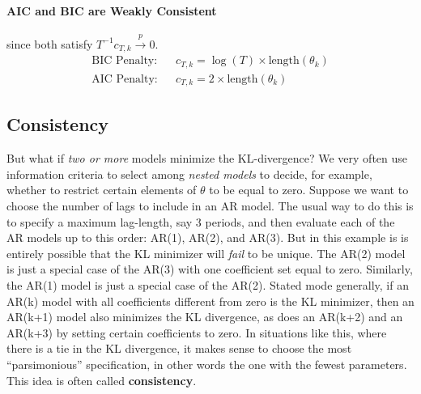 \paragraph{AIC and BIC are Weakly Consistent}
since both satisfy $T^{-1}c_{T,k} \overset{p}{\rightarrow} 0$.
	\begin{eqnarray*}
		\mbox{BIC Penalty:}&& c_{T,k} = \log(T) \times \mbox{length}(\theta_k)\\
		\mbox{AIC Penalty:} && c_{T,k} = 2\times \mbox{length}(\theta_k)
	\end{eqnarray*}

\subsection{Consistency}
But what if \emph{two or more} models minimize the KL-divergence? We very often use information criteria to select among \emph{nested models} to decide, for example, whether to restrict certain elements of $\theta$ to be equal to zero. 
Suppose we want to choose the number of lags to include in an AR model. 
The usual way to do this is to specify a maximum lag-length, say 3 periods, and then evaluate each of the AR models up to this order: AR(1), AR(2), and AR(3). 
But in this example is is entirely possible that the KL minimizer will \emph{fail} to be unique. 
The AR(2) model is just a special case of the AR(3) with one coefficient set equal to zero. 
Similarly, the AR(1) model is just a special case of the AR(2). 
Stated mode generally, if an AR(k) model with all coefficients different from zero is the KL minimizer, then an AR(k+1) model also minimizes the KL divergence, as does an AR(k+2) and an AR(k+3) by setting certain coefficients to zero. 
In situations like this, where there is a tie in the KL divergence, it makes sense to choose the most ``parsimonious'' specification, in other words the one with the fewest parameters. 
This idea is often called \textbf{consistency}.


